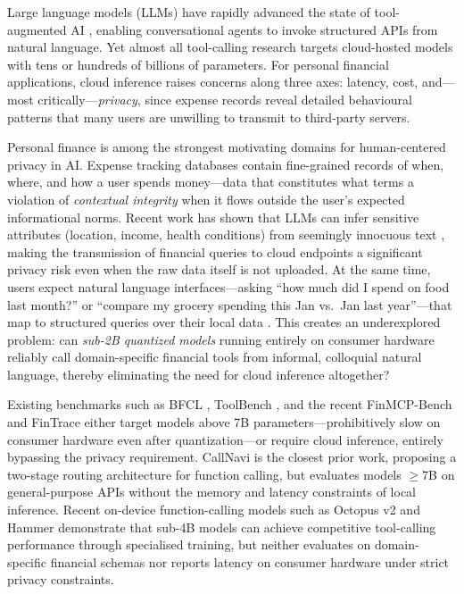 \documentclass[11pt,twocolumn]{article}
\begin{document}
Large language models (LLMs) have rapidly advanced the state of tool-augmented AI \citep{schick2024toolformer, patil2023gorilla, qin2023toolllm}, enabling conversational agents to invoke structured APIs from natural language.
Yet almost all tool-calling research targets cloud-hosted models with tens or hundreds of billions of parameters.
For personal financial applications, cloud inference raises concerns along three axes: latency, cost, and---most critically---\emph{privacy}, since expense records reveal detailed behavioural patterns that many users are unwilling to transmit to third-party servers.

Personal finance is among the strongest motivating domains for human-centered privacy in AI.
Expense tracking databases contain fine-grained records of when, where, and how a user spends money---data that constitutes what \citet{nissenbaum2004privacy} terms a violation of \emph{contextual integrity} when it flows outside the user's expected informational norms.
Recent work has shown that LLMs can infer sensitive attributes (location, income, health conditions) from seemingly innocuous text \citep{staab2024memorization}, making the transmission of financial queries to cloud endpoints a significant privacy risk even when the raw data itself is not uploaded.
At the same time, users expect natural language interfaces---asking ``how much did I spend on food last month?'' or ``compare my grocery spending this Jan vs.\ Jan last year''---that map to structured queries over their local data \citep{li2024personal}.
This creates an underexplored problem: can \emph{sub-2B quantized models} running entirely on consumer hardware reliably call domain-specific financial tools from informal, colloquial natural language, thereby eliminating the need for cloud inference altogether?

Existing benchmarks such as BFCL \citep{yan2024bfcl}, ToolBench \citep{qin2023toolllm}, and the recent FinMCP-Bench \citep{finmcpbench2026} and FinTrace \citep{fintrace2026} either target models above 7B parameters---prohibitively slow on consumer hardware even after quantization---or require cloud inference, entirely bypassing the privacy requirement.
CallNavi \citep{callnavi2025} is the closest prior work, proposing a two-stage routing architecture for function calling, but evaluates models $\geq$7B on general-purpose APIs without the memory and latency constraints of local inference.
Recent on-device function-calling models such as Octopus v2 \citep{chen2024octopus} and Hammer \citep{lin2024hammer} demonstrate that sub-4B models can achieve competitive tool-calling performance through specialised training, but neither evaluates on domain-specific financial schemas nor reports latency on consumer hardware under strict privacy constraints.
\end{document}
